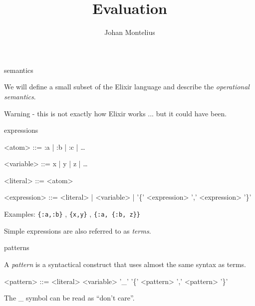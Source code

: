 

\title[ID1019 Evaluation]{Evaluation}


\author{Johan Montelius}
\date{\semester}



\begin{frame}
\titlepage
\end{frame}

\begin{frame}{semantics}

We will define a small subset of the Elixir language and describe the
{\em operational semantics}.


\pause \vspace{40pt}Warning - this is not exactly how Elixir works ... but it could have been.

\end{frame}


\begin{frame}{expressions}

\begin{grammar}
<atom> ::= :a | :b | :c | \ldots

<variable> ::= x | y | z | \ldots

<literal> ::= <atom>

<expression> ::= <literal> | <variable> |  '\{' <expression> ',' <expression> '\}'
\end{grammar}


\pause \vspace{20pt} Examples: {\tt \{:a,:b\}} , {\tt \{x,y\}} , {\tt \{:a, \{:b, z\}\}}

\pause \vspace{20pt} Simple expressions are also referred to as {\em terms}.
\end{frame}

\begin{frame}{patterns}

  A {\em pattern} is a syntactical construct that uses almost the same
  syntax as terms.

  \pause
  \vspace{20pt}

\begin{grammar}
<pattern> ::= <literal> 
      \alt <variable> 
      \alt '\_' 
      \alt '\{' <pattern> ',' <pattern> '\}'
\end{grammar}

 \pause \vspace{20pt}
  The \_ symbol can be read as ``don't care''.

\end{frame}


